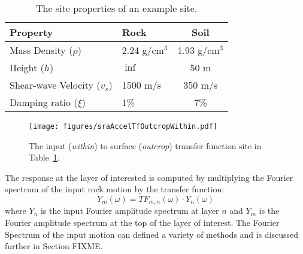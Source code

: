 \documentclass[11pt]{report}
\begin{document}
\begin{table}[t]
  \centering
  \begin{tabular}{llc}
	\hline\hline
	\textbf{Property} & \textbf{Rock} & \textbf{Soil} \\
	\hline
	Mass Density ($\rho$) 		& 2.24 g/cm$^3$ & 1.93 g/cm$^3$ \\
	Height ($h$)				& $\inf$		& 50 m \\
	Shear-wave Velocity ($v_s$)	& 1500 m/s		& 350 m/s \\
	Damping ratio ($\xi$)		& 1\%			& 7\% \\
	\hline
  \end{tabular}
  \caption{The site properties of an example site.}
  \label{tab:sraSite}
\end{table}
\begin{figure}[t]
  \begin{center}
	\texttt{[image: figures/sraAccelTfOutcropWithin.pdf]}
  \end{center}
  \caption{The input (\emph{within}) to surface (\emph{outcrop}) transfer function site in
  Table~\ref{tab:sraSite}.}
  \label{fig:sraAccelTfOutcropWithin}
\end{figure}


The response at the layer of interested is computed by multiplying the Fourier spectrum of the
input rock motion by the transfer function:
\begin{equation}
  Y_m(\omega) = TF_{m,n}(\omega) \cdot Y_n(\omega)
  \label{eq:tfApplication}
\end{equation}
where $Y_n$ is the input Fourier amplitude spectrum at layer $n$ and $Y_m$ is the Fourier amplitude
spectrum at the top of the layer of interest.  The Fourier Spectrum of the input motion can defined
a variety of methods and is discussed further in Section FIXME.
\end{document}
